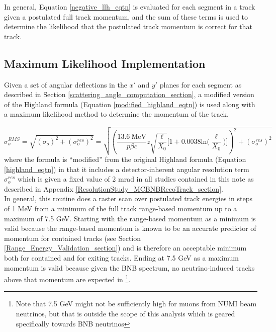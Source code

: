 In general, Equation \ref{negative_llh_eqtn} is evaluated for each segment in a track given a postulated full track momentum, and the sum of these terms is used to determine the likelihood that the postulated track momentum is correct for that track.

\subsection{Maximum Likelihood Implementation}\label{maximum_likelihood_section}

Given a set of angular deflections in the $x'$ and $y'$ planes for each segment as described in Section \ref{scattering_angle_computation_section}, a modified version of the Highland formula (Equation \ref{modified_highland_eqtn}) is used along with a maximum likelihood method to determine the momentum of the track. 

\begin{equation}\label{modified_highland_eqtn}
\sigma_{o}^{RMS} = \sqrt{ (\sigma_o)^2 + (\sigma_o^{res})^2} = \sqrt{ (\frac{13.6\  \text{MeV}}{p\beta c}z\sqrt{\frac{\ell}{X_0}}\Big[1+0.0038\text{ln}\Big(\frac{\ell}{X_0}\Big)\Big])^2 + (\sigma_o^{res})^2 }
\end{equation}
where the formula is ``modified'' from the original Highland formula (Equation \ref{highland_eqtn}) in that it includes a detector-inherent angular resolution term $\sigma_o^{res}$ which is given a fixed value of 2 mrad in all studies contained in this note as described in Appendix \ref{ResolutionStudy_MCBNBRecoTrack_section}\cite{leonidas2}.\\

In general, this routine does a raster scan over postulated track energies in steps of 1 MeV from a minimum of the full track range-based momentum up to a maximum of 7.5 GeV. Starting with the range-based momentum as a minimum is valid because the range-based momentum is known to be an accurate predictor of momentum for contained tracks (see Section \ref{Range_Energy_Validation_section}) and is therefore an acceptable minimum both for contained and for exiting tracks. Ending at 7.5 GeV as a maximum momentum is valid because given the BNB spectrum, no neutrino-induced tracks above that momentum are expected in {\ub}\footnote{Note that 7.5 GeV might not be sufficiently high for muons from NUMI beam neutrinos, but that is outside the scope of this analysis which is geared specifically towards BNB neutrinos}.\\

